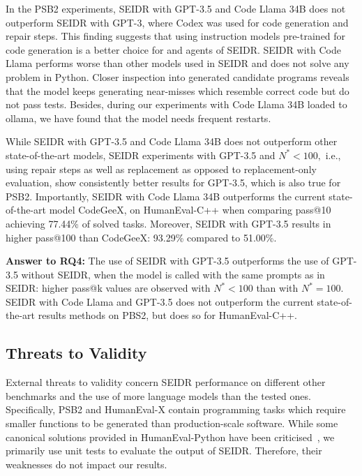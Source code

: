 In the PSB2 experiments, SEIDR with GPT-3.5 and Code Llama 34B does not outperform SEIDR with GPT-3, where Codex was used for code generation and repair steps. 
This finding suggests that using instruction models pre-trained for code generation is a better choice for  \synthesize{} and \debug{} agents of SEIDR. 
SEIDR with Code Llama performs worse than other models used in SEIDR and does not solve any problem in Python. 
Closer inspection into generated candidate programs reveals that the model keeps generating near-misses which resemble correct code but do not pass tests.
Besides, during our experiments with Code Llama 34B loaded to ollama, we have found that the model needs frequent restarts. 

While SEIDR with GPT-3.5 and Code Llama 34B does not outperform other state-of-the-art models, SEIDR experiments with GPT-3.5 and $N^*<100,$ i.e., using repair steps as well as replacement as opposed to replacement-only evaluation, show consistently better results for GPT-3.5, which is also true for PSB2.  
Importantly, SEIDR  with Code Llama 34B outperforms the current state-of-the-art model CodeGeeX, on HumanEval-C++ when comparing pass@10 achieving 77.44\% of solved tasks.
Moreover, SEIDR with GPT-3.5 results in higher pass@100 than CodeGeeX: 93.29\% compared to 51.00\%. 



\begin{framed}
\noindent
\textbf{Answer to RQ4:} 
The use of SEIDR with GPT-3.5 outperforms the use of GPT-3.5 without SEIDR, when the model is called with the same prompts as in SEIDR: higher pass@k values are observed with $N^*<100$ than with $N^*=100.$ SEIDR with Code Llama and GPT-3.5 does not outperform the current state-of-the-art results methods on PBS2, but does so for HumanEval-C++. 
\end{framed}



\newpage \subsection{Threats to Validity}
\label{sec:seidr-threats}

External threats to validity concern SEIDR performance on different other benchmarks and the use of more language models than the tested ones. 
Specifically, PSB2 and HumanEval-X contain programming tasks which require smaller functions to be generated than production-scale software.
While some canonical solutions provided in HumanEval-Python have been criticised~\cite{liu2023:your}, we primarily use unit tests to evaluate the output of SEIDR. Therefore, their weaknesses do not impact our results.

